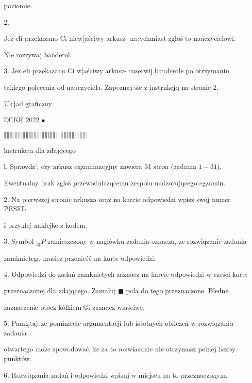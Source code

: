 \documentclass[a4paper,12pt]{article}
\begin{document}
poziomie.

2.

$\mathrm{J}\mathrm{e}\dot{\mathrm{z}}$ eli przekazano Ci niew[aściwy arkusz- natychmiast zgloś to nauczycielowi.

Nie rozrywaj banderol.

3. $\mathrm{J}\mathrm{e}\dot{\mathrm{z}}$ eli przekazano Ci w[aściwy arkusz- rozerwij banderole po otrzymaniu

takiego polecenia od nauczyciela. Zapoznaj $\mathrm{s}\mathrm{i}\mathrm{e}$ z instrukcjq na stronie 2.

$\mathrm{U}\mathrm{k}\}\mathrm{a}\mathrm{d}$ graficzny

\copyright CKE 2022 $\bullet$

$\Vert\Vert\Vert\Vert\Vert\Vert\Vert\Vert\Vert\Vert\Vert\Vert\Vert\Vert\Vert\Vert\Vert\Vert\Vert\Vert\Vert\Vert\Vert\Vert\Vert\Vert\Vert\Vert\Vert\Vert|$




lnstrukcja dla zdajqcego

l. Sprawdz', czy arkusz egzaminacyjny zawiera 31 stron (zadania $1-31$).

Ewentualny brak zgloś przewodniczqcemu zespolu nadzorujqcego egzamin.

2. Na pierwszej stronie arkusza oraz na karcie odpowiedzi wpisz swój numer PESEL

i przyklej naklejke z kodem.

3. Symbol ${}_{1\mathrm{g}}P$ zamieszczony w naglówku zadania oznacza, $\dot{\mathrm{z}}\mathrm{e}$ rozwiqzanie zadania

zamknietego musisz przenieśč na karte odpowiedzi.

4. Odpowiedzi do zadań zamknietych zaznacz na karcie odpowiedzi w cześci karty

przeznaczonej dla zdajqcego. Zamaluj $\blacksquare$ pola do tego przeznaczone. Bledne

zaznaczenie otocz kólkiem \copyright i zaznacz wlaściwe.

5. $\mathrm{P}\mathrm{a}\mathrm{m}\mathrm{i}_{9}\mathrm{t}\mathrm{a}\mathrm{j}, \dot{\mathrm{z}}\mathrm{e}$ pominiecie argumentacji lub istotnych obliczeń w rozwiqzaniu zadania

otwartego $\mathrm{m}\mathrm{o}\dot{\mathrm{z}}\mathrm{e}$ spowodować, $\dot{\mathrm{z}}\mathrm{e}$ za to rozwiazanie nie otrzymasz pelnej liczby punktów.

6. Rozwiqzania zadań i odpowiedzi wpisuj w miejscu na to przeznaczonym.
\end{document}
